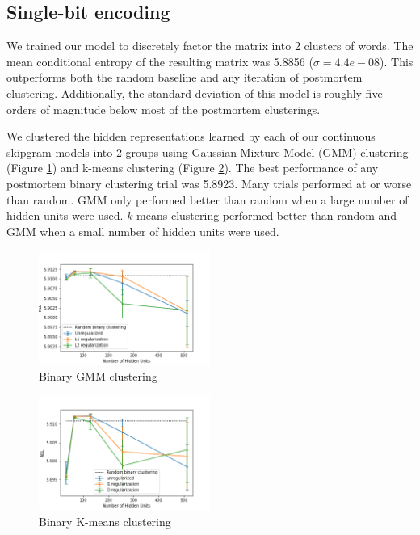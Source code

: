 \documentclass[11pt,letterpaper]{article}
\begin{document}
\subsection{Single-bit encoding}

We trained our model to discretely factor the matrix into 2 clusters of words. The mean conditional entropy of the resulting matrix was 5.8856 ($\sigma=4.4e-08$). This outperforms both the random baseline and any iteration of postmortem clustering. Additionally, the standard deviation of this model is roughly five orders of magnitude below most of the postmortem clusterings.

We clustered the hidden representations learned by each of our continuous skipgram models into 2 groups using Gaussian Mixture Model (GMM) clustering (Figure \ref{f:bgmm}) and k-means clustering (Figure \ref{f:bkm}). The best performance of any postmortem binary clustering trial was 5.8923. Many trials performed at or worse than random. GMM only performed better than random when a large number of hidden units were used. $k$-means clustering performed better than random and GMM when a small number of hidden units were used.

\begin{figure}
  \caption{Binary GMM clustering}
\label{f:bgmm}
  \centering
    \includegraphics[width=0.5\textwidth]{binary_gmm.png}
\end{figure}

\begin{figure}
  \caption{Binary K-means clustering}
\label{f:bkm}
  \centering
    \includegraphics[width=0.5\textwidth]{binary_km.png}
\end{figure}
\end{document}
